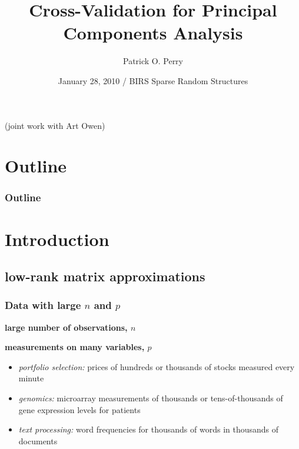 \documentclass{beamer}
\title{Cross-Validation for Principal Components Analysis}
\author[P. O. Perry]{Patrick O. Perry}
\institute[Harvard University]
{
  Statistics and Information Sciences Laboratory\\
  Harvard University
}
\date[BIRS Workshop on Sparse Random Structures]
{January 28, 2010 / BIRS Sparse Random Structures}
\begin{document}
\begin{frame}
  \titlepage
  \hfill\small{(joint work with Art Owen)}
\end{frame}

\section*{Outline}
\begin{frame}
  \frametitle{Outline}
  \tableofcontents
\end{frame}


\section{Introduction}

\subsection{low-rank matrix approximations}
\begin{frame}
\frametitle{Data with large $n$ and $p$}
  \textbf{large number of observations, $n$}

  \textbf{measurements on many variables, $p$} 

  \begin{itemize}
  \item \textit{portfolio selection:} prices of hundreds or thousands of stocks measured every minute 
  \item \textit{genomics:} microarray measurements of thousands or tens-of-thousands of gene expression levels for patients
  \item \textit{text processing:} word frequencies for thousands of words in thousands of documents
  \end{itemize}
\end{frame}

\end{document}
